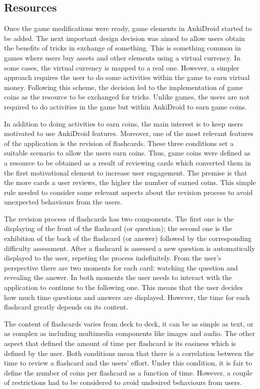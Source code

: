 \subsection{Resources}
Once the game modifications were ready, game elements in AnkiDroid started to be added. The next important design decision was aimed to allow users obtain the benefits of tricks in exchange of something. This is something common in games where users buy assets and other elements using a virtual currency. In some cases, the virtual currency is mapped to a real one. However, a simpler approach requires the user to do some activities within the game to earn virtual money. Following this scheme, the decision led to the implementation of game coins as the resource to be exchanged for tricks. Unlike games, the users are not required to do activities in the game but within AnkiDroid to earn game coins.

In addition to doing activities to earn coins, the main interest is to keep users motivated to use AnkiDroid features. Moreover, one of the most relevant features of the application is the revision of flashcards. These three conditions set a suitable scenario to allow the users earn coins. Thus, game coins were defined as a resource to be obtained as a result of reviewing cards which converted them in the first motivational element to increase user engagement. The premise is that the more cards a user reviews, the higher the number of earned coins. This simple rule needed to consider some relevant aspects about the revision process to avoid unexpected behaviours from the users.

The revision process of flashcards has two components. The first one is the displaying of the front of the flashcard (or question); the second one is the exhibition of the back of the flashcard (or answer) followed by the corresponding difficulty assessment. After a flashcard is assessed a new question is automatically displayed to the user, repeting the process indefinitely. From the user's perspective there are two moments for each card: watching the question and revealing the answer. In both moments the user needs to interact with the application to continue to the following one. This means that the user decides how much time questions and answers are displayed. However, the time for each flashcard greatly depends on its content.

The content of flashcards varies from deck to deck, it can be as simple as text, or as complex as including multimedia components like images and audio. The other aspect that defined the amount of time per flashcard is its easiness which is defined by the user. Both conditions mean that there is a correlation between the time to review a flashcard and the users' effort. Under this condition, it is fair to define the number of coins per flashcard as a function of time. However, a couple of restrictions had to be considered to avoid undesired behaviours from users.

